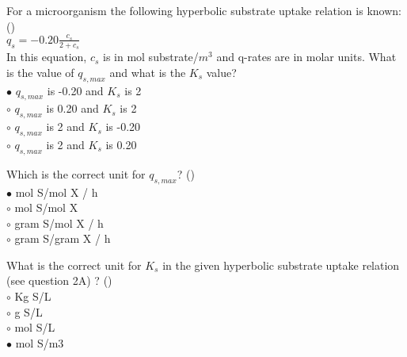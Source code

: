 \documentclass[]{beamer}
\begin{document}
\begin{frame}[shrink] {} 
\color{blue}
For a microorganism the following hyperbolic substrate uptake relation is known: ({\color{green}{Q2a}})\\[0.3em]
{\color{gray} $q_s = -0.20\frac{c_s}{2+c_s}$}\\
In this equation, $c_{s}$ is in mol substrate/$m^{3}$ and q-rates are in molar units. What is the value of $q_{s,max}$ and what is the $K_{s}$ value?\\
\color{black}
\setlength{\parindent}{-0.4cm}
{\color{red}$\bullet$}  $q_{s,max}$ is -0.20 and $K_{s}$ is 2 \\
{\color{red}$\circ$}  $q_{s,max}$ is 0.20 and $K_{s}$ is 2 \\
{\color{red}$\circ$}  $q_{s,max}$ is 2 and $K_{s}$ is -0.20 \\
{\color{red}$\circ$}  $q_{s,max}$ is 2 and $K_{s}$ is 0.20 \\
\end{frame}


\begin{frame}[shrink] {} 
\color{blue}
Which is the correct unit for $q_{s,max}$?  ({\color{green}{Q2b}})\\
\color{black}
\setlength{\parindent}{-0.4cm}
{\color{red}$\bullet$}  mol S/mol X / h \\
{\color{red}$\circ$}  mol S/mol X \\
{\color{red}$\circ$}  gram S/mol X / h \\
{\color{red}$\circ$}  gram S/gram X / h \\
\end{frame}


\begin{frame}[shrink] {} 
\color{blue}
What is the correct unit for $K_{s}$ in the given hyperbolic substrate uptake relation (see question 2A) ?  ({\color{green}{Q2c}})\\
\color{black}
\setlength{\parindent}{-0.4cm}
{\color{red}$\circ$}  Kg S/L \\
{\color{red}$\circ$}  g S/L \\
{\color{red}$\circ$}  mol S/L \\
{\color{red}$\bullet$}  mol S/m3 \\
\end{frame}
\end{document}
